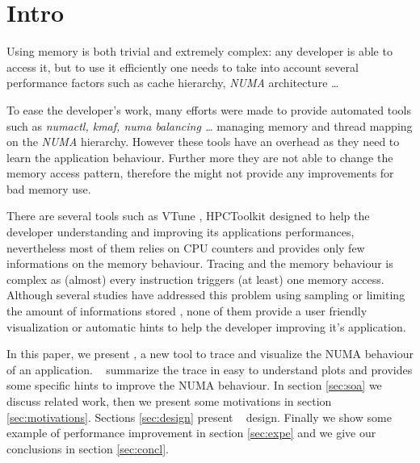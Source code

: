 \section{Intro}
\label{sec:intro}

Using memory is both trivial and extremely complex: any developer is able to
access it, but to use it efficiently one needs to take into account several
performance factors such as cache hierarchy, \emph{NUMA} architecture
\cite{Drepper07What} \ldots

To ease the developer's work, many efforts were made to provide automated
tools such as \emph{numactl, kmaf, numa balancing \ldots}
managing memory and thread mapping on the \emph{NUMA} hierarchy. However these
tools have an overhead as they need to learn the application behaviour.
Further more they are not able to change the memory access pattern, therefore
the might not provide any improvements for bad memory use.

There are several tools such as VTune \cite{Reinders05VTune},
HPCToolkit\cite{Adhianto10HPCTOOLKIT}  designed to help the
developer understanding and improving its applications performances,
nevertheless most of them relies on CPU counters and provides only few
informations on the memory behaviour. Tracing and the memory behaviour is
complex as (almost) every instruction triggers (at least) one memory access.
Although several studies have addressed this problem using sampling
\cite{Lachaize12MemProf} or limiting the amount of informations stored
, none of them provide a user friendly visualization or automatic hints
to help the developer improving it's application.


In this paper, we present \TABARNAC, a new tool to trace and visualize the
NUMA behaviour of an application. \TABARNAC~ summarize the trace in easy to
understand plots and provides some specific hints to improve the NUMA
behaviour. In section \ref{sec:soa} we discuss related work, then we present
some motivations in section \ref{sec:motivations}. Sections \ref{sec:design}
present \TABARNAC~ design. Finally we show some example of performance
improvement in section \ref{sec:expe} and we give our conclusions in section
\ref{sec:concl}.

